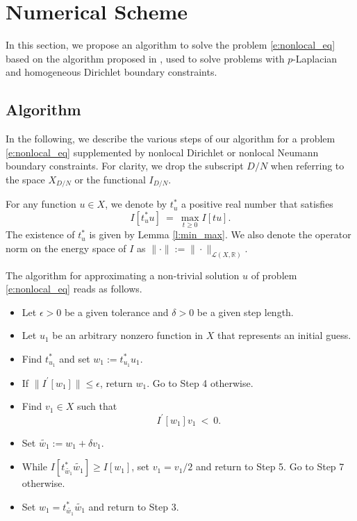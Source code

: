\documentclass[11pt]{amsart}   	%
\theoremstyle{plain}
\numberwithin{equation}{section}
\def\R{\mathbb{R}}
\def\Lin{\mathcal{L}}
\begin{document}

\iffalse

\section{Numerical Scheme}\label{s:numerics_old}

In this section, we propose an algorithm to solve the problem \eqref{e:nonlocal_eq} based on the algorithm proposed in \cite{bailova2021mountain}, used to solve problems with $p$-Laplacian and homogeneous Dirichlet boundary constraints.


\subsection{Algorithm}\label{s:numerics_algo_old}
In the following, we describe the various steps of our algorithm for a problem \eqref{e:nonlocal_eq} supplemented by nonlocal Dirichlet or nonlocal Neumann boundary constraints. For clarity, we drop the subscript $D/N$ when referring to the space $X_{D/N}$ or the functional $I_{D/N}$. 

For any function $u \in X$, we denote by $t^*_u$ a positive real number that satisfies
$$I[t^*_u u] \ = \ \max_{t\geq 0} I[tu].$$
The existence of $t^*_u$ is given by Lemma \ref{l:min_max}. We also denote the operator norm on the energy space of $I$ as $\|\cdot\| := \|\cdot\|_{\Lin(X, \R)}$.

The algorithm for approximating a non-trivial solution $u$ of problem \eqref{e:nonlocal_eq} reads as follows.
\begin{itemize}
    \item[0.] Let $\epsilon>0$ be a given tolerance and $\delta>0$ be a given step length.
    
    \item[1.] Let $u_1$ be an arbitrary nonzero function in $X$ that represents an initial guess.
    
    \item[2.] Find $t^*_{u_1}$ and set $w_1 := t^*_{u_1} u_1$.
    
    \item[3.] If $\|I^\prime [w_1] \| \leq \epsilon$, return $w_1$. Go to Step 4 otherwise.
    
    \item[4.] Find $v_1 \in X$ such that
    \begin{equation}\label{e:algo_step4_old}
        I^\prime[w_1] v_1 \ < \ 0.
    \end{equation}

    \item[5.] Set $\tilde{w_1} := w_1 + \delta v_1$.
    
    \item[6.] While $I[t^*_{\tilde{w_1}} \tilde{w_1}] \geq I[w_1]$, set $v_1=v_1/2$ and return to Step 5. Go to Step 7 otherwise.
    
    \item[7.] Set $w_1=t^*_{\tilde{w_1}} \tilde{w_1}$ and return to Step 3.
\end{itemize}
\end{document}
